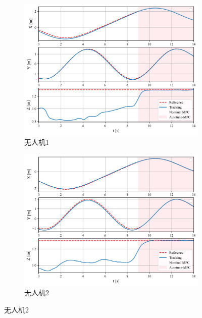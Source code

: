 \documentclass[lang=chs, degree=master, blindreview=true, winfonts=true]{yanputhesis}
\begin{document}
\begin{figure}[hbt!]
    \centering
    \begin{subfigure}[b]{0.48\textwidth}
        \centering
        \includegraphics[width=\textwidth]{picture/kk/4.png}
        \caption{无人机1}
        \label{quadrotor00}
    \end{subfigure}
    \hfill
    \begin{subfigure}[b]{0.48\textwidth}
        \centering
        \includegraphics[width=\textwidth]{picture/kk/5.png}
        \caption{无人机2}
        \label{quadrotor01}
    \end{subfigure}
    
    \vspace{0.5cm} %
    

\end{figure}
\end{document}
